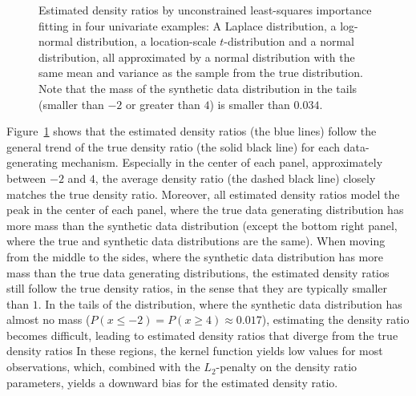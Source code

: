 \documentclass[
]{article}
\begin{document}
\linespread{2}

\linespread{1}

\begin{figure}[t]


\caption{\label{fig-sim1-results}Estimated density ratios by
unconstrained least-squares importance fitting in four univariate
examples: A Laplace distribution, a log-normal distribution, a
location-scale \(t\)-distribution and a normal distribution, all
approximated by a normal distribution with the same mean and variance as
the sample from the true distribution. Note that the mass of the
synthetic data distribution in the tails (smaller than \(-2\) or greater
than \(4\)) is smaller than \(0.034\).}

\end{figure}%

\linespread{2}

Figure~\ref{fig-sim1-results} shows that the estimated density ratios
(the blue lines) follow the general trend of the true density ratio (the
solid black line) for each data-generating mechanism. Especially in the
center of each panel, approximately between \(-2\) and \(4\), the
average density ratio (the dashed black line) closely matches the true
density ratio. Moreover, all estimated density ratios model the peak in
the center of each panel, where the true data generating distribution
has more mass than the synthetic data distribution (except the bottom
right panel, where the true and synthetic data distributions are the
same). When moving from the middle to the sides, where the synthetic
data distribution has more mass than the true data generating
distributions, the estimated density ratios still follow the true
density ratios, in the sense that they are typically smaller than \(1\).
In the tails of the distribution, where the synthetic data distribution
has almost no mass (\(P(x \leq -2) = P(x \geq 4) \approx 0.017\)),
estimating the density ratio becomes difficult, leading to estimated
density ratios that diverge from the true density ratios In these
regions, the kernel function yields low values for most observations,
which, combined with the \(L_2\)-penalty on the density ratio
parameters, yields a downward bias for the estimated density ratio.
\end{document}
